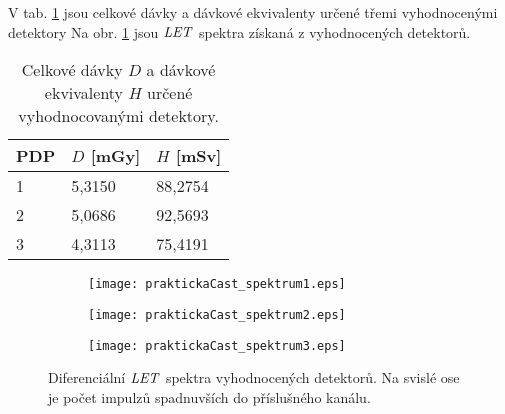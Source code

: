 V tab. \ref{tab:praktickaCast_davkyVysledky} jsou celkové dávky a dávkové ekvivalenty určené třemi vyhodnocenými detektory Na obr. \ref{fig:praktickaCast_LETspektra} jsou $\mathit{LET}$ spektra získaná z vyhodnocených detektorů.
\begin{table}[h]
  \centering
  \caption{Celkové dávky $D$ a dávkové ekvivalenty $H$ určené vyhodnocovanými detektory.}
  \label{tab:praktickaCast_davkyVysledky}
  \begin{tabular}{lll}
	\toprule
	PDP&$D$ [mGy]&$H$ [mSv]\\
	\midrule
	1&5,3150&88,2754\\
	2&5,0686&92,5693\\
	3&4,3113&75,4191\\
	\bottomrule
  \end{tabular}
\end{table}
\begin{figure}[h]
  \centering
  \begin{subfigure}{0.49\textwidth}
	\texttt{[image: praktickaCast\_spektrum1.eps]}
	\caption{}
  \end{subfigure}
  \begin{subfigure}{0.49\textwidth}
	\texttt{[image: praktickaCast\_spektrum2.eps]}
	\caption{}
  \end{subfigure}
  \begin{subfigure}{0.49\textwidth}
	\texttt{[image: praktickaCast\_spektrum3.eps]}
	\caption{}
  \end{subfigure}
  \caption{Diferenciální $\mathit{LET}$ spektra vyhodnocených detektorů. Na svislé ose je počet impulzů spadnuvších do příslušného kanálu.}
  \label{fig:praktickaCast_LETspektra}
\end{figure}

